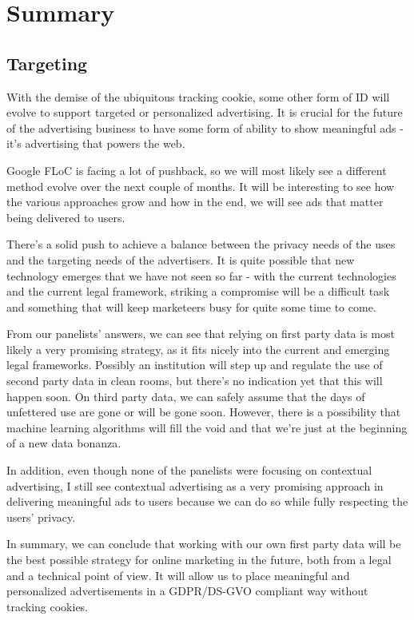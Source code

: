 %
%

\pagebreak
\section{Summary}

\onehalfspacing

\subsection{Targeting}

With the demise of the ubiquitous tracking cookie, some other form of ID will evolve to support targeted or personalized advertising. It is crucial for the future of the advertising business to have some form of ability to show meaningful ads - it's advertising that powers the web.

Google FLoC is facing a lot of pushback, so we will most likely see a different method evolve over the next couple of months. It will be interesting to see how the various approaches grow and how in the end, we will see ads that matter being delivered to users.

There's a solid push to achieve a balance between the privacy needs of the uses and the targeting needs of the advertisers. It is quite possible that new technology emerges that we have not seen so far - with the current technologies and the current legal framework, striking a compromise will be a difficult task and something that will keep marketeers busy for quite some time to come.

From our panelists' answers, we can see that relying on first party data is most likely a very promising strategy, as it fits nicely into the current and emerging legal frameworks. Possibly an institution will step up and regulate the use of second party data in clean rooms, but there's no indication yet that this will happen soon. On third party data, we can safely assume that the days of unfettered use are gone or will be gone soon. However, there is a possibility that machine learning algorithms will fill the void and that we're just at the beginning of a new data bonanza.

In addition, even though none of the panelists were focusing on contextual advertising, I still see contextual advertising as a very promising approach in delivering meaningful ads to users because we can do so while fully respecting the users' privacy.

In summary, we can conclude that working with our own first party data will be the best possible strategy for online marketing in the future, both from a legal and a technical point of view. It will allow us to place meaningful and personalized advertisements in a GDPR/DS-GVO compliant way without tracking cookies.

